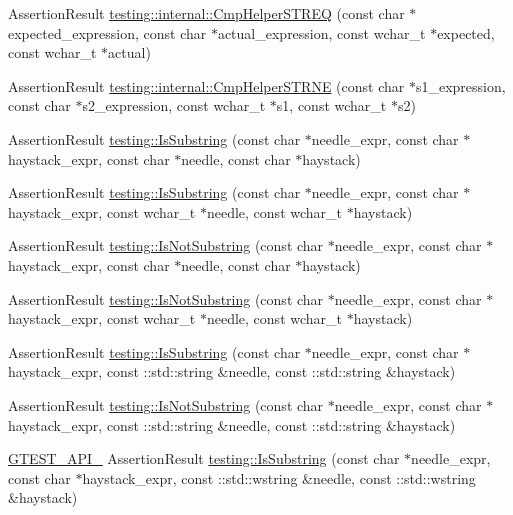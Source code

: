 \begin{DoxyCompactItemize}
\item 
Assertion\-Result \hyperlink{namespacetesting_1_1internal_a5a60e3eb4490e67f00fdb62dd147cd89}{testing\-::internal\-::\-Cmp\-Helper\-S\-T\-R\-E\-Q} (const char $\ast$expected\-\_\-expression, const char $\ast$actual\-\_\-expression, const wchar\-\_\-t $\ast$expected, const wchar\-\_\-t $\ast$actual)
\item 
Assertion\-Result \hyperlink{namespacetesting_1_1internal_a415a953647bbc9469f062dc966061efb}{testing\-::internal\-::\-Cmp\-Helper\-S\-T\-R\-N\-E} (const char $\ast$s1\-\_\-expression, const char $\ast$s2\-\_\-expression, const wchar\-\_\-t $\ast$s1, const wchar\-\_\-t $\ast$s2)
\item 
Assertion\-Result \hyperlink{namespacetesting_a390c4f66fe7e9098117eb77e5fffa4ad}{testing\-::\-Is\-Substring} (const char $\ast$needle\-\_\-expr, const char $\ast$haystack\-\_\-expr, const char $\ast$needle, const char $\ast$haystack)
\item 
Assertion\-Result \hyperlink{namespacetesting_aa1c82529c7591d2a9fd016de45dd9113}{testing\-::\-Is\-Substring} (const char $\ast$needle\-\_\-expr, const char $\ast$haystack\-\_\-expr, const wchar\-\_\-t $\ast$needle, const wchar\-\_\-t $\ast$haystack)
\item 
Assertion\-Result \hyperlink{namespacetesting_a2288dcf4249f88af67dcd46544dc49a6}{testing\-::\-Is\-Not\-Substring} (const char $\ast$needle\-\_\-expr, const char $\ast$haystack\-\_\-expr, const char $\ast$needle, const char $\ast$haystack)
\item 
Assertion\-Result \hyperlink{namespacetesting_a53e5c6e91ea429c43de7f4f57e33d166}{testing\-::\-Is\-Not\-Substring} (const char $\ast$needle\-\_\-expr, const char $\ast$haystack\-\_\-expr, const wchar\-\_\-t $\ast$needle, const wchar\-\_\-t $\ast$haystack)
\item 
Assertion\-Result \hyperlink{namespacetesting_a571c7edcfc574269833ebe3e7d338ec5}{testing\-::\-Is\-Substring} (const char $\ast$needle\-\_\-expr, const char $\ast$haystack\-\_\-expr, const \-::std\-::string \&needle, const \-::std\-::string \&haystack)
\item 
Assertion\-Result \hyperlink{namespacetesting_abe7b3fa1c9528745f934d4a14155ea87}{testing\-::\-Is\-Not\-Substring} (const char $\ast$needle\-\_\-expr, const char $\ast$haystack\-\_\-expr, const \-::std\-::string \&needle, const \-::std\-::string \&haystack)
\item 
\hyperlink{gtest-port_8h_aa73be6f0ba4a7456180a94904ce17790}{G\-T\-E\-S\-T\-\_\-\-A\-P\-I\-\_\-} Assertion\-Result \hyperlink{namespacetesting_a2ff5c4d0c112d92b20232bd0cf173904}{testing\-::\-Is\-Substring} (const char $\ast$needle\-\_\-expr, const char $\ast$haystack\-\_\-expr, const \-::std\-::wstring \&needle, const \-::std\-::wstring \&haystack)

\end{DoxyCompactItemize}
